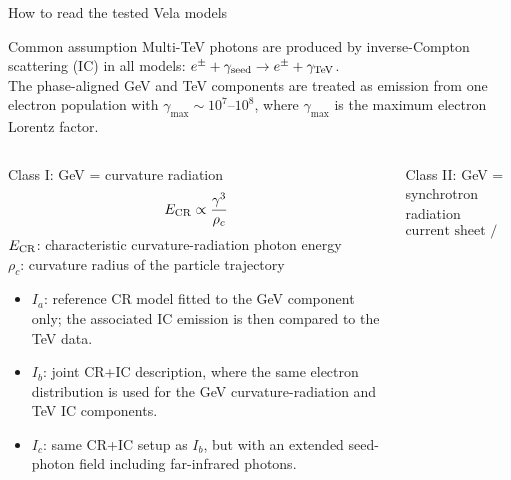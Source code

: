 \documentclass[aspectratio=1610,9pt]{beamer}
\begin{document}
\begin{frame}{How to read the tested Vela models}
  \small

  \begin{block}{Common assumption}
    Multi-TeV photons are produced by inverse-Compton scattering (IC) in all models:
    \(e^\pm+\gamma_{\rm seed}\rightarrow e^\pm+\gamma_{\rm TeV}\).\\
    The phase-aligned GeV and TeV components are treated as emission from one
    electron population with \(\gamma_{\max}\sim10^7\text{--}10^8\), where
    \(\gamma_{\max}\) is the maximum electron Lorentz factor.
  \end{block}

  \vspace{-0.1cm}

  \begin{columns}[T,onlytextwidth]

    \begin{block}{Class I: GeV = curvature radiation}
      \[
      E_{\rm CR}\propto \frac{\gamma^3}{\rho_c}
      \]
      {\scriptsize
      \(E_{\rm CR}\): characteristic curvature-radiation photon energy\\
      \(\rho_c\): curvature radius of the particle trajectory
      }

      \vspace{0.08cm}

      \begin{itemize}
        \item \(I_a\): reference CR model fitted to the GeV component only;
        the associated IC emission is then compared to the TeV data.
        
        \item \(I_b\): joint CR+IC description, where the same electron distribution
        is used for the GeV curvature-radiation and TeV IC components.
        
        \item \(I_c\): same CR+IC setup as \(I_b\), but with an extended seed-photon
        field including far-infrared photons.
      \end{itemize}
    \end{block}

    \begin{block}{Class II: GeV = synchrotron radiation}
      \[
      \text{current sheet / striped wind scenario}
      \]

      \vspace{-0.15cm}


\end{block}
\end{columns}
\end{frame}
\end{document}
